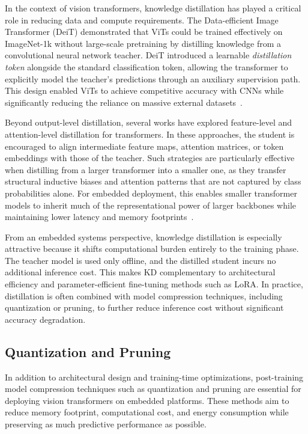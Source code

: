 \documentclass[runningheads,a4paper]{llncs}
\begin{document}
In the context of vision transformers, knowledge distillation has played a critical role in reducing data and compute requirements. The Data-efficient Image Transformer (DeiT) demonstrated that ViTs could be trained effectively on ImageNet-1k without large-scale pretraining by distilling knowledge from a convolutional neural network teacher. DeiT introduced a learnable \emph{distillation token} alongside the standard classification token, allowing the transformer to explicitly model the teacher’s predictions through an auxiliary supervision path. This design enabled ViTs to achieve competitive accuracy with CNNs while significantly reducing the reliance on massive external datasets~\cite{touvron2021deit}.

Beyond output-level distillation, several works have explored feature-level and attention-level distillation for transformers. In these approaches, the student is encouraged to align intermediate feature maps, attention matrices, or token embeddings with those of the teacher. Such strategies are particularly effective when distilling from a larger transformer into a smaller one, as they transfer structural inductive biases and attention patterns that are not captured by class probabilities alone. For embedded deployment, this enables smaller transformer models to inherit much of the representational power of larger backbones while maintaining lower latency and memory footprints~\cite{zhang2022minivit,wu2022tinyvit}.

From an embedded systems perspective, knowledge distillation is especially attractive because it shifts computational burden entirely to the training phase. The teacher model is used only offline, and the distilled student incurs no additional inference cost. This makes KD complementary to architectural efficiency and parameter-efficient fine-tuning methods such as LoRA. In practice, distillation is often combined with model compression techniques, including quantization or pruning, to further reduce inference cost without significant accuracy degradation.

\subsection{Quantization and Pruning}
In addition to architectural design and training-time optimizations, post-training model compression techniques such as quantization and pruning are essential for deploying vision transformers on embedded platforms. These methods aim to reduce memory footprint, computational cost, and energy consumption while preserving as much predictive performance as possible.
\end{document}
